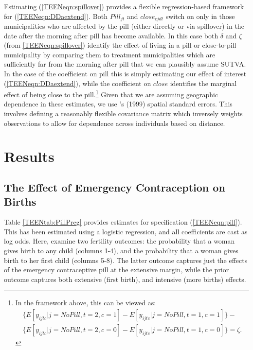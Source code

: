 Estimating (\ref{TEENeqn:spillover}) provides a flexible regression-based 
framework for (\ref{TEENeqn:DDaextend}).  Both $Pill_{jt}$ and $close_{cjdt}$
switch on only in those municipalities who are affected by the pill (either
directly or via spillover) in the date after the morning after pill has become
available.  In this case both $\delta$ and $\zeta$ (from \ref{TEENeqn:spillover}) 
identify the effect of living in a pill or close-to-pill municipality by 
comparing them to treatment municipalities which are sufficiently far from the 
morning after pill that we can plausibly assume SUTVA.  In the case of the 
coefficient on pill this is simply estimating our effect of interest
(\ref{TEENeqn:DDaextend}), while the coefficient on $close$ identifies the 
marginal effect of being close to the pill.\footnote{In the framework above, 
this can be viewed as: 
\begin{equation}
\nonumber
\begin{split}
\{E[y_{ijtc}|j=No Pill,t=2,c=1]- E[y_{ijtc}|j=No Pill,t=1,c=1]\}- \\
\{E[y_{ijtc}|j=No Pill,t=2,c=0]- E[y_{ijtc}|j=No Pill,t=1,c=0]\} = \zeta.
\end{split}
\end{equation}}
Given that we are assuming geographic dependence in these estimates, we use 
\citeauthor{Conley1999}'s (1999) spatial standard errors.  This involves defining 
a reasonably flexible covariance matrix which inversely weights observations to 
allow for dependence across individuals based on distance.

\section{Results}
\label{TEENscn:results}
\subsection{The Effect of Emergency Contraception on Births}
\label{TEENsscn:rbirths}
Table \ref{TEENtab:PillPreg} provides estimates for specification 
(\ref{TEENeqn:pill}).  This has been estimated using a logistic regression, and
all coefficients are cast as log odds.  Here, \person examine two fertility 
outcomes: the probability that a woman gives birth to any child (columns 1-4), 
and the probability that a woman gives birth to her first child (columns 5-8). 
The latter outcome captures just the effects of the emergency contraceptive pill
at the extensive margin, while the prior outcome captures both extensive (first
birth), and intensive (more births) effects.

